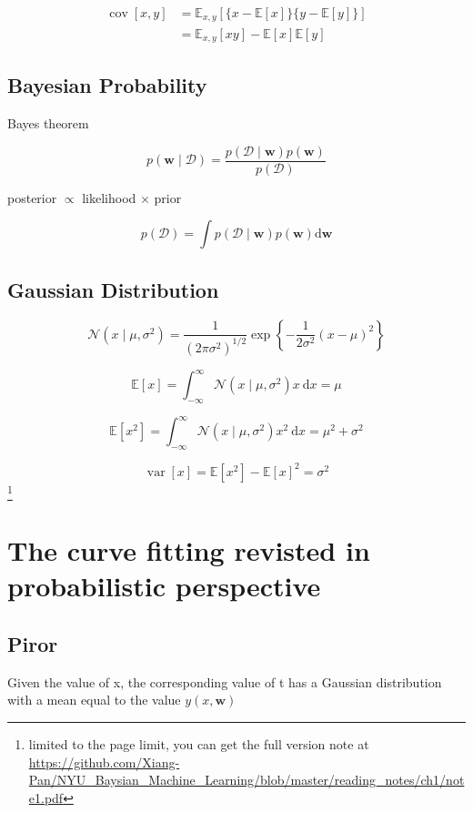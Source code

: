 \documentclass[11pt,en,cite=authoryear]{elegantpaper}
\begin{document}
$$\begin{aligned} \operatorname{cov}[x, y] &=\mathbb{E}_{x, y}[\{x-\mathbb{E}[x]\}\{y-\mathbb{E}[y]\}] \\ &=\mathbb{E}_{x, y}[x y]-\mathbb{E}[x] \mathbb{E}[y] \end{aligned}$$

\subsection{Bayesian Probability}
Bayes theorem

$$p(\mathbf{w} \mid \mathcal{D})=\frac{p(\mathcal{D} \mid \mathbf{w}) p(\mathbf{w})}{p(\mathcal{D})}$$

posterior $\propto$ likelihood $\times$ prior

$$p(\mathcal{D})=\int p(\mathcal{D} \mid \mathbf{w}) p(\mathbf{w}) \mathrm{d} \mathbf{w}$$

\subsection{Gaussian Distribution}
$$\mathcal{N}\left(x \mid \mu, \sigma^{2}\right)=\frac{1}{\left(2 \pi \sigma^{2}\right)^{1 / 2}} \exp \left\{-\frac{1}{2 \sigma^{2}}(x-\mu)^{2}\right\}$$

$$\mathbb{E}[x]=\int_{-\infty}^{\infty} \mathcal{N}\left(x \mid \mu, \sigma^{2}\right) x \mathrm{~d} x=\mu$$

$$\mathbb{E}\left[x^{2}\right]=\int_{-\infty}^{\infty} \mathcal{N}\left(x \mid \mu, \sigma^{2}\right) x^{2} \mathrm{~d} x=\mu^{2}+\sigma^{2}$$

$$\operatorname{var}[x]=\mathbb{E}\left[x^{2}\right]-\mathbb{E}[x]^{2}=\sigma^{2}$$
\footnote{limited to the page limit, you can get the full version note at \url{https://github.com/Xiang-Pan/NYU_Baysian_Machine_Learning/blob/master/reading_notes/ch1/note1.pdf} }

\section{The curve fitting revisted in probabilistic perspective}
\subsection{Piror}
Given the value of x, the corresponding value of t has a Gaussian distribution with a mean equal to the value $y(x, \mathbf{w})$
\end{document}
